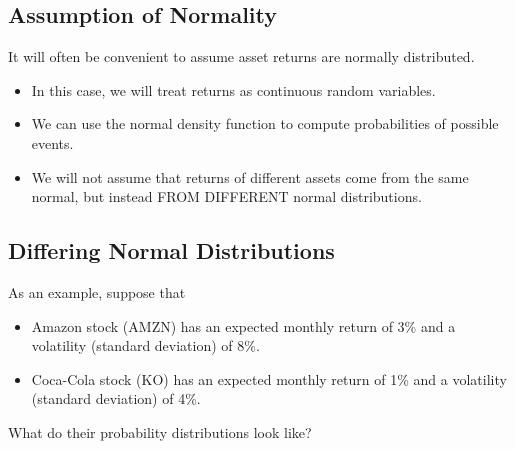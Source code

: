 \documentclass[letterpaper,10pt,english]{sphinxmanual}
\begin{document}
\subsection{Assumption of Normality}
\label{risk:assumption-of-normality}
It will often be convenient to assume asset returns are normally
distributed.
\begin{itemize}
\item {} 
In this case, we will treat returns as continuous random variables.

\end{itemize}
\begin{itemize}
\item {} 
We can use the normal density function to compute probabilities of
possible events.

\end{itemize}
\begin{itemize}
\item {} 
We will not assume that returns of different assets come from the
same normal, but instead FROM DIFFERENT normal distributions.

\end{itemize}


\subsection{Differing Normal Distributions}
\label{risk:differing-normal-distributions}
As an example, suppose that
\begin{itemize}
\item {} 
Amazon stock (AMZN) has an expected monthly return of 3\% and a
volatility (standard deviation) of 8\%.

\end{itemize}
\begin{itemize}
\item {} 
Coca-Cola stock (KO) has an expected monthly return of 1\% and a
volatility (standard deviation) of 4\%.

\end{itemize}

What do their probability distributions look like?
\end{document}
